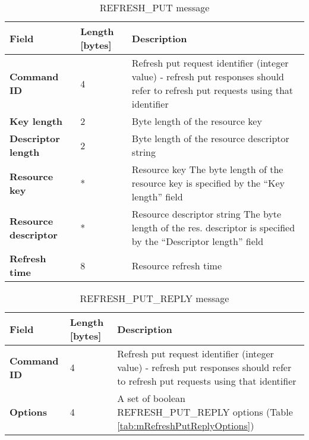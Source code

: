 \begin{table}[H]
\scriptsize
\begin{center}
\begin{tabular}{p{3cm} p{2cm} p{9.5cm}}
	\hline
	\textbf{Field}						& \textbf{Length} [bytes]				& \textbf{Description}				\\[1mm]
    \hline
    \textbf{Command ID}					& 4										& Refresh put request identifier (integer value) - refresh put responses should refer to refresh put requests using that identifier		\\[1.5mm]
	\textbf{Key length}					& 2										& Byte length of the resource key					\\[1.5mm]
	\textbf{Descriptor length}			& 2										& Byte length of the resource descriptor string		\\[1.5mm]
	\textbf{Resource key}				& *										& Resource key \newline * The byte length of the resource key is specified by the ``Key length'' field										\\[1.5mm]
	\textbf{Resource descriptor}		& *										& Resource descriptor string \newline * The byte length of the res. descriptor is specified by the ``Descriptor length'' field			\\[1.5mm]
	\textbf{Refresh time}				& 8										& Resource refresh time								\\[1.5mm]
    \hline
\end{tabular}
\end{center}
\caption{REFRESH\_PUT message}
\label{tab:mRefreshPut}
\end{table}


\begin{table}[H]
\scriptsize
\begin{center}
\begin{tabular}{p{3cm} p{2cm} p{9.5cm}}
	\hline
	\textbf{Field}						& \textbf{Length} [bytes]				& \textbf{Description}				\\[1mm]
    \hline
	\textbf{Command ID}					& 4										& Refresh put request identifier (integer value) - refresh put responses should refer to refresh put requests using that identifier		\\[1.5mm]
    \textbf{Options}					& 4										& A set of boolean REFRESH\_PUT\_REPLY options (Table \ref{tab:mRefreshPutReplyOptions})					\\[1.5mm]
    \hline
\end{tabular}
\end{center}
\caption{REFRESH\_PUT\_REPLY message}
\label{tab:mRefreshPutReply}
\end{table}

